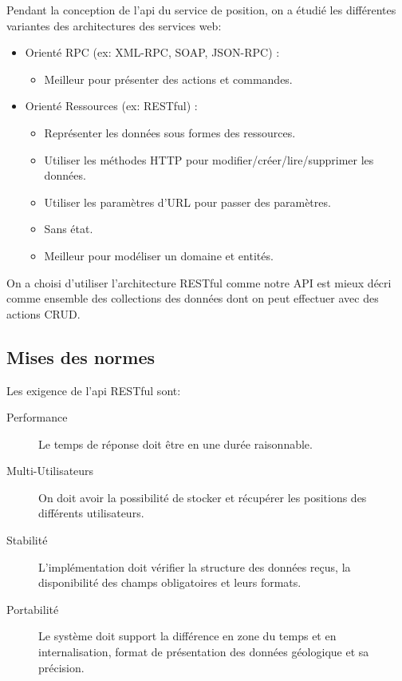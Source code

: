 Pendant la conception de l'api du service de position, on a étudié les
différentes variantes des architectures des services web:
\begin{itemize}
    \item Orienté RPC (ex: XML-RPC, SOAP, JSON-RPC) :
        \begin{itemize}
            \item Meilleur pour présenter des actions et commandes.
        \end{itemize}
    \item Orienté Ressources (ex: RESTful) :
        \begin{itemize}
            \item Représenter les données sous formes des ressources.
            \item Utiliser les méthodes HTTP pour modifier/créer/lire/supprimer
                les données.
            \item Utiliser les paramètres d'URL pour passer des paramètres.
            \item Sans état.
            \item Meilleur pour modéliser un domaine et entités.
        \end{itemize}
\end{itemize}

On a choisi d'utiliser l'architecture RESTful comme notre API est mieux décri
comme ensemble des collections des données dont on peut effectuer avec des
actions CRUD.

\subsection{Mises des normes}

Les exigence de l'api RESTful sont:
\begin{description}
    \item [Performance] Le temps de réponse doit être en une durée raisonnable.
    \item [Multi-Utilisateurs] On doit avoir la possibilité de stocker et
        récupérer les positions des différents utilisateurs.
    \item [Stabilité] L'implémentation doit vérifier la structure des données
        reçus, la disponibilité des champs obligatoires et leurs formats.
    \item [Portabilité] Le système doit support la différence en zone du temps
        et en internalisation, format de présentation des données géologique et
        sa précision.
\end{description}


